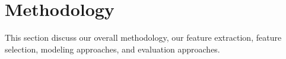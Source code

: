 \section{Methodology}
This section discuss our overall methodology, our feature extraction, feature selection, modeling approaches, and evaluation approaches.